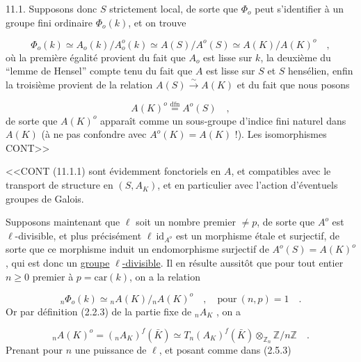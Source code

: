 11.1.  Supposons donc $S$ strictement local, de sorte que $\Phi_{o}$ peut s'identifier à un groupe fini ordinaire $\Phi_{o}(k)$, et on trouve

\begin{equation}\tag{11.1.1}
\Phi_{o}(k) \simeq A_{o}(k)/A_{o}^{o}(k) \simeq A(S)/A^{o}(S) \simeq A(K)/A(K)^{o} \quad ,
\end{equation}
où la première égalité provient du fait que $A_{o}$ est lisse sur $k$, la deuxième du ``lemme de Hensel'' compte tenu du fait que $A$ est lisse sur $S$ et $S$ hensélien, enfin la troisième provient de la relation $A(S) \stackrel{\sim}{\longrightarrow} A(K)$ et du fait que nous posons

\begin{equation}\tag{11.1.2}
A(K)^{o} \stackrel{\mathrm{dfn}}{=} A^{o}(S) \quad ,
\end{equation}
de sorte que $A(K)^{o}$ apparaît comme un sous-groupe d'indice fini naturel dans $A(K)$ (à ne pas confondre avec $A^{o}(K) = A(K)$ !). Les isomorphismes CONT>>



<<CONT (11.1.1) sont évidemment fonctoriels en $A$, et compatibles avec le transport de structure en $(S,A_{K})$, et en particulier avec l'action d'éventuels groupes de Galois.

Supposons maintenant que $\ell$ soit un nombre premier $\neq p$, de sorte que $A^{o}$ est $\ell$-divisible, et plus précisément $\ell\ \mathrm{id}_{A^{o}}$ est un morphisme étale et surjectif, de sorte que ce morphisme induit un endomorphisme surjectif de $A^{o}(S)=A(K)^{o}$, qui est donc un \underline{groupe} $\ell$\underline{-divisible}. Il en résulte aussitôt que pour tout entier $n \geq 0$ premier à $p = \mathrm{car}(k)$, on a la relation

\begin{equation}\tag{11.1.3}
{}_{n}\Phi_{o}(k) \simeq {}_{n}A(K)/{}_{n}A(K)^{o} \quad , \quad \mathrm{pour}\ (n,p) = 1 \quad .
\end{equation}
Or par définition (2.2.3) de la partie fixe de ${}_{n}A_{K}$ , on a

\begin{equation}\tag{11.1.4}
{}_{n}A(K)^{o} = ({}_{n}A_{K})^{f}(\bar{K}) \simeq T_{n}(A_{K})^{f}(\bar{K}) \otimes_{\mathbb{Z}_{n}} \mathbb{Z}/n\mathbb{Z} \quad .
\end{equation}
Prenant pour $n$ une puissance de $\ell$, et posant comme dans (2.5.3)

